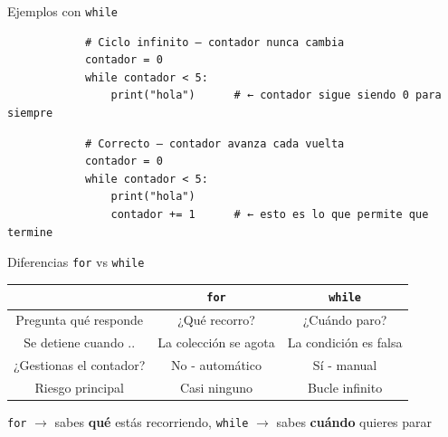 \documentclass{beamer}
\begin{document}
    \begin{frame}[fragile,t]{Ejemplos con \texttt{while}}
        \begin{verbatim}
            # Ciclo infinito — contador nunca cambia
            contador = 0
            while contador < 5:
                print("hola")      # ← contador sigue siendo 0 para siempre
        \end{verbatim}

        \begin{verbatim}
            # Correcto — contador avanza cada vuelta
            contador = 0
            while contador < 5:
                print("hola")
                contador += 1      # ← esto es lo que permite que termine
        \end{verbatim}
    \end{frame}

    \begin{frame}{Diferencias \texttt{for} vs \texttt{while}}
        \centering
        \begin{tabular}{|c|c|c|}
            \hline
             & \texttt{for} & \texttt{while} \\
            \hline
            Pregunta qué responde & ¿Qué recorro? & ¿Cuándo paro? \\
            \hline
            Se detiene cuando .. & La colección se agota & La condición es falsa \\
            \hline
            ¿Gestionas el contador? & No - automático & Sí - manual \\
            \hline
            Riesgo principal & Casi ninguno & Bucle infinito \\
            \hline
        \end{tabular}
        \texttt{for} $\rightarrow$ sabes \textbf{qué} estás recorriendo, \texttt{while} $\rightarrow$ sabes \textbf{cuándo} quieres parar 
    \end{frame}
\end{document}
